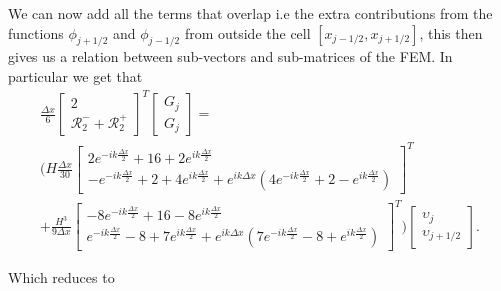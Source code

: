  We can now add all the terms that overlap i.e the extra contributions from the functions $\phi_{j+1/2}$ and $\phi_{j-1/2}$ from outside the cell $\left[x_{j-1/2}, x_{j+1/2}\right]$, this then gives us a relation between sub-vectors and sub-matrices of the FEM. In particular we get that
 \begin{multline*}
\frac{\Delta x}{6}\begin{bmatrix} 2  \\ \mathcal{R}^-_2 + \mathcal{R}^+_2 \end{bmatrix}^T \begin{bmatrix} G_j  \\ G_j\end{bmatrix}  = \\ \Bigg(H\frac{\Delta x}{30}\begin{bmatrix}2e^{-ik\frac{\Delta x}{2}}  + 16  +2 e^{ik\frac{\Delta x}{2}} \\ -e^{-ik\frac{\Delta x}{2}} +  2 + 4e^{ik\frac{\Delta x}{2}} + e^{ik{\Delta x}}\left(4e^{-ik\frac{\Delta x}{2}} +  2 - e^{ik\frac{\Delta x}{2}}\right) \end{bmatrix}^T  \\+ \frac{H^3 }{9\Delta x}\begin{bmatrix}  -8e^{-ik\frac{\Delta x}{2}} +  16  -8e^{ik\frac{\Delta x}{2}} \\  e^{-ik\frac{\Delta x}{2}} -8 + 7e^{ik\frac{\Delta x}{2}}  + e^{ik{\Delta x}}\left(7e^{-ik\frac{\Delta x}{2}} -8 + e^{ik\frac{\Delta x}{2}}  \right)\end{bmatrix}^T    \Bigg) \begin{bmatrix} \upsilon_j  \\ \upsilon_{j+1/2} \end{bmatrix}.
 \end{multline*}
 
 Which reduces to
 
